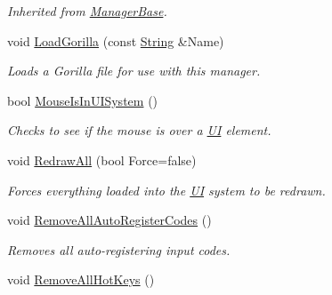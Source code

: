 \begin{DoxyCompactItemize}
\begin{DoxyCompactList}\small\item\em Inherited from \hyperlink{classMezzanine_1_1ManagerBase}{ManagerBase}. \item\end{DoxyCompactList}\item 
void \hyperlink{classMezzanine_1_1UIManager_afd46390fd59084a5d834fc7cfecfbd3d}{LoadGorilla} (const \hyperlink{namespaceMezzanine_acf9fcc130e6ebf08e3d8491aebcf1c86}{String} \&Name)
\begin{DoxyCompactList}\small\item\em Loads a Gorilla file for use with this manager. \item\end{DoxyCompactList}\item 
bool \hyperlink{classMezzanine_1_1UIManager_a7f3ea82551d2a894545235f4a9cba549}{MouseIsInUISystem} ()
\begin{DoxyCompactList}\small\item\em Checks to see if the mouse is over a \hyperlink{namespaceMezzanine_1_1UI}{UI} element. \item\end{DoxyCompactList}\item 
void \hyperlink{classMezzanine_1_1UIManager_a62fe2ec9d4dad13762aa154f65d707a7}{RedrawAll} (bool Force=false)
\begin{DoxyCompactList}\small\item\em Forces everything loaded into the \hyperlink{namespaceMezzanine_1_1UI}{UI} system to be redrawn. \item\end{DoxyCompactList}\item 
\hypertarget{classMezzanine_1_1UIManager_a294aa11be082a4d3130e7aedf34747c8}{
void \hyperlink{classMezzanine_1_1UIManager_a294aa11be082a4d3130e7aedf34747c8}{RemoveAllAutoRegisterCodes} ()}
\label{classMezzanine_1_1UIManager_a294aa11be082a4d3130e7aedf34747c8}

\begin{DoxyCompactList}\small\item\em Removes all auto-\/registering input codes. \item\end{DoxyCompactList}\item 
\hypertarget{classMezzanine_1_1UIManager_ae08dfa033157e91247ca95bae4d3fd7f}{
void \hyperlink{classMezzanine_1_1UIManager_ae08dfa033157e91247ca95bae4d3fd7f}{RemoveAllHotKeys} ()}
\label{classMezzanine_1_1UIManager_ae08dfa033157e91247ca95bae4d3fd7f}


\end{DoxyCompactItemize}
